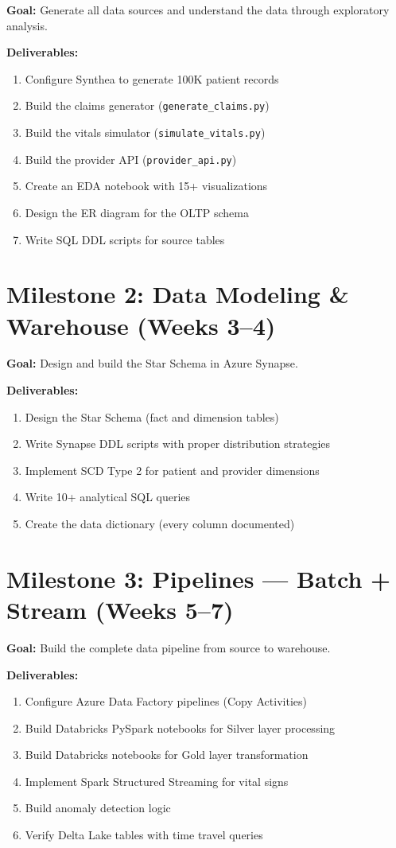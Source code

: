 \documentclass[12pt, a4paper, oneside]{report}
\begin{document}
\textbf{Goal:} Generate all data sources and understand the data through exploratory analysis.

\textbf{Deliverables:}
\begin{enumerate}[label=\ding{51}]
    \item Configure Synthea to generate 100K patient records
    \item Build the claims generator (\texttt{generate\_claims.py})
    \item Build the vitals simulator (\texttt{simulate\_vitals.py})
    \item Build the provider API (\texttt{provider\_api.py})
    \item Create an EDA notebook with 15+ visualizations
    \item Design the ER diagram for the OLTP schema
    \item Write SQL DDL scripts for source tables
\end{enumerate}

\section{Milestone 2: Data Modeling \& Warehouse (Weeks 3--4)}

\textbf{Goal:} Design and build the Star Schema in Azure Synapse.

\textbf{Deliverables:}
\begin{enumerate}[label=\ding{51}]
    \item Design the Star Schema (fact and dimension tables)
    \item Write Synapse DDL scripts with proper distribution strategies
    \item Implement SCD Type 2 for patient and provider dimensions
    \item Write 10+ analytical SQL queries
    \item Create the data dictionary (every column documented)
\end{enumerate}

\section{Milestone 3: Pipelines --- Batch + Stream (Weeks 5--7)}

\textbf{Goal:} Build the complete data pipeline from source to warehouse.

\textbf{Deliverables:}
\begin{enumerate}[label=\ding{51}]
    \item Configure Azure Data Factory pipelines (Copy Activities)
    \item Build Databricks PySpark notebooks for Silver layer processing
    \item Build Databricks notebooks for Gold layer transformation
    \item Implement Spark Structured Streaming for vital signs
    \item Build anomaly detection logic
    \item Verify Delta Lake tables with time travel queries
\end{enumerate}
\end{document}
